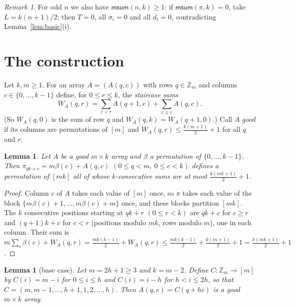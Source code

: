 \documentclass[11pt]{amsart}
\newtheorem{lemma}[theorem]{Lemma}
\theoremstyle{remark}
\newtheorem{remark}[theorem]{Remark}
\newcommand{\msum}{\mathsf{msum}}
\newcommand{\Z}{\mathbb{Z}}
\begin{document}
\begin{remark}\label{rem:trivial}
For odd $n$ we also have $\msum(n,k)\ge1$: if $\msum(\pi,k)=0$, take $L=k(n+1)/2$; then $T=0$, all $\sigma_i=0$ and
all $d_i=0$, contradicting Lemma~\ref{lem:basic}(i).
\end{remark}

\section{The construction}

Let $k,m\ge1$. For an array $A=(A(q,c))$ with rows $q\in\Z_m$ and columns $c\in\{0,\dots,k-1\}$ define, for
$0\le r\le k$, the \emph{staircase sums}
\[
  W_A(q,r)=\sum_{c<r}A(q+1,c)+\sum_{c\ge r}A(q,c).
\]
(So $W_A(q,0)$ is the sum of row $q$ and $W_A(q,k)=W_A(q+1,0)$.) Call $A$ \emph{good} if its columns are
permutations of $[m]$ and $W_A(q,r)\le\frac{k(m+1)}{2}+1$ for all $q$ and $r$.

\begin{lemma}\label{lem:blocks}
Let $A$ be a good $m\times k$ array and $\beta$ a permutation of $\{0,\dots,k-1\}$. Then
$\pi_{qk+c}=m\beta(c)+A(q,c)$ $(0\le q<m,\ 0\le c<k)$ defines a permutation of $[mk]$ all of whose
$k$-consecutive sums are at most $\frac{k(mk+1)}{2}+1$.
\end{lemma}

\begin{proof}
Column $c$ of $A$ takes each value of $[m]$ once, so $\pi$ takes each value of the block
$\{m\beta(c)+1,\dots,m\beta(c)+m\}$ once, and these blocks partition $[mk]$. The $k$ consecutive positions starting
at $qk+r$ $(0\le r<k)$ are $qk+c$ for $c\ge r$ and $(q+1)k+c$ for $c<r$ (positions modulo $mk$, rows modulo $m$), one
in each column. Their sum is $m\sum_c\beta(c)+W_A(q,r)=\frac{mk(k-1)}{2}+W_A(q,r)\le\frac{mk(k-1)}{2}+\frac{k(m+1)}{2}+1
=\frac{k(mk+1)}{2}+1$.
\end{proof}

\begin{lemma}[base case]\label{lem:base}
Let $m=2h+1\ge3$ and $k=m-2$. Define $C:\Z_m\to[m]$ by $C(i)=m-i$ for $0\le i\le h$ and $C(i)=i-h$ for
$h<i\le 2h$, so that $C=(m,m-1,\dots,h+1,1,2,\dots,h)$. Then $A(q,c)=C(q+hc)$ is a good $m\times k$ array.
\end{lemma}
\end{document}
